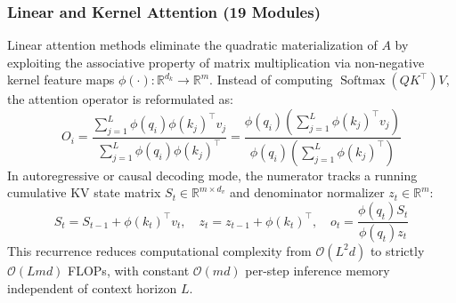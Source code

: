 \documentclass{article}
\begin{document}
\subsubsection{Linear and Kernel Attention (19 Modules)}
Linear attention methods eliminate the quadratic materialization of $A$ by exploiting the associative property of matrix multiplication via non-negative kernel feature maps $\phi(\cdot): \mathbb{R}^{d_k} \to \mathbb{R}^{m}$. Instead of computing $\operatorname{Softmax}(Q K^\top) V$, the attention operator is reformulated as:
\begin{equation}
    O_i = \frac{\sum_{j=1}^L \phi(q_i) \phi(k_j)^\top v_j}{\sum_{j=1}^L \phi(q_i) \phi(k_j)^\top} = \frac{\phi(q_i) \left(\sum_{j=1}^L \phi(k_j)^\top v_j\right)}{\phi(q_i) \left(\sum_{j=1}^L \phi(k_j)^\top\right)}
\end{equation}
In autoregressive or causal decoding mode, the numerator tracks a running cumulative KV state matrix $S_t \in \mathbb{R}^{m \times d_v}$ and denominator normalizer $z_t \in \mathbb{R}^{m}$:
\begin{equation}
    S_t = S_{t-1} + \phi(k_t)^\top v_t, \quad z_t = z_{t-1} + \phi(k_t)^\top, \quad o_t = \frac{\phi(q_t) S_t}{\phi(q_t) z_t}
\end{equation}
This recurrence reduces computational complexity from $\mathcal{O}(L^2 d)$ to strictly $\mathcal{O}(L m d)$ FLOPs, with constant $\mathcal{O}(m d)$ per-step inference memory independent of context horizon $L$. 
\end{document}
